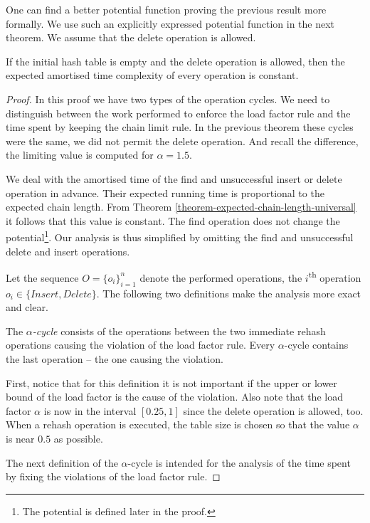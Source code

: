 One can find a better potential function proving the previous result more formally. We use such an explicitly expressed potential function in the next theorem. We assume that the delete operation is allowed.
\begin{theorem}
\label{theorem-delete-time}
If the initial hash table is empty and the delete operation is allowed, then the expected amortised time complexity of every operation is constant.
\end{theorem}
\begin{proof}
In this proof we have two types of the operation cycles. We need to distinguish between the work performed to enforce the load factor rule and the time spent by keeping the chain limit rule. In the previous theorem these cycles were the same, we did not permit the delete operation. And recall the difference, the limiting value is computed for $\alpha = 1.5$.

We deal with the amortised time of the find and unsuccessful insert or delete operation in advance. Their expected running time is proportional to the expected chain length. From Theorem \ref{theorem-expected-chain-length-universal} it follows that this value is constant. The find operation does not change the potential\footnote{The potential is defined later in the proof.}. Our analysis is thus simplified by omitting the find and unsuccessful delete and insert operations.

Let the sequence $O = \{o_i\}_{i=1}^{n}$ denote the performed operations, the $i$\textsuperscript{th} operation $o_i \in \lbrace Insert, Delete \rbrace$. The following two definitions make the analysis more exact and clear.

\begin{definition}
The \emph{$\alpha$-cycle} consists of the operations between the two immediate rehash operations causing the violation of the load factor rule. Every $\alpha$-cycle contains the last operation -- the one causing the violation.
\end{definition}
First, notice that for this definition it is not important if the upper or lower bound of the load factor is the cause of the violation. Also note that the load factor $\alpha$ is now in the interval $\left[0.25, 1\right]$ since the delete operation is allowed, too. When a rehash operation is executed, the table size is chosen so that the value $\alpha$ is near $0.5$ as possible. 

The next definition of the $\alpha$-cycle is intended for the analysis of the time spent by fixing the violations of the load factor rule.


\end{proof}
